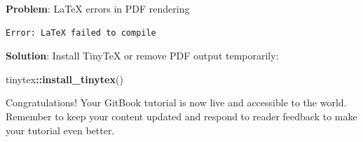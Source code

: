 \documentclass[
]{book}
\newenvironment{Shaded}{\begin{snugshade}}{\end{snugshade}}
\newcommand{\FunctionTok}[1]{\textcolor[rgb]{0.13,0.29,0.53}{\textbf{#1}}}
\newcommand{\NormalTok}[1]{#1}
\newcommand{\SpecialCharTok}[1]{\textcolor[rgb]{0.81,0.36,0.00}{\textbf{#1}}}
\begin{document}
\textbf{Problem}: LaTeX errors in PDF rendering

\begin{verbatim}
Error: LaTeX failed to compile
\end{verbatim}

\textbf{Solution}: Install TinyTeX or remove PDF output temporarily:

\begin{Shaded}
\begin{Highlighting}[]
\NormalTok{tinytex}\SpecialCharTok{::}\FunctionTok{install\_tinytex}\NormalTok{()}
\end{Highlighting}
\end{Shaded}

Congratulations! Your GitBook tutorial is now live and accessible to the world. Remember to keep your content updated and respond to reader feedback to make your tutorial even better.


\end{document}
